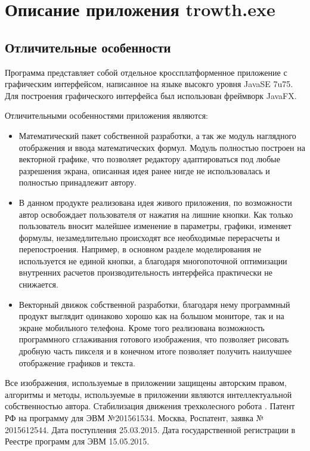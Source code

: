 \newpage
\appendix
\renewcommand{\thechapter}{\Asbuk{chapter}}
\chapter{Описание приложения trowth.exe} 
\section{Отличительные особенности} \label{app1start}

Программа представляет собой отдельное кроссплатформенное приложение с графическим интерфейсом, написанное на языке высокго уровня JavaSE 7u75. Для построения графического интерфейса был использован фреймворк JavaFX.	

Отличительными особенностями приложения являются:
\begin{itemize}
\item{Математический пакет собственной разработки, а так же модуль наглядного отображения и ввода  математических формул. Модуль полностью построен на векторной графике, что позволяет редактору адаптироваться под любые разрешения экрана, описанная идея ранее нигде не использовалась и полностью принадлежит автору.}
\item{В данном продукте реализована идея живого приложения, по возможности автор освобождает пользователя от нажатия на лишние кнопки. Как только пользователь вносит малейшее изменение в параметры, графики, изменяет формулы, незамедлительно происходят все необходимые перерасчеты и перепостроения. Например, в основном разделе моделирования не используется не единой кнопки, а благодаря многопоточной оптимизации внутренних расчетов производительность интерфейса практически не снижается.}
\item{Векторный движок собственной разработки, благодаря нему программный продукт выглядит одинаково хорошо как на большом мониторе, так и на экране мобильного телефона. Кроме того реализована возможность программного сглаживания готового изображения, что позволяет рисовать дробную часть пикселя и в конечном итоге позволяет получить наилучшее отображение графиков и текста.}
\end{itemize}

Все изображения, используемые в приложении защищены авторским правом, алгоритмы и методы, используемые в приложении являются интеллектуальной собственностью автора. Стабилизация движения трехколесного робота . Патент РФ на программу для ЭВМ №201561534.  Москва, Роспатент, заявка № 2015612544. Дата поступления 25.03.2015.  Дата государственной регистрации в Реестре программ для ЭВМ 15.05.2015. 


